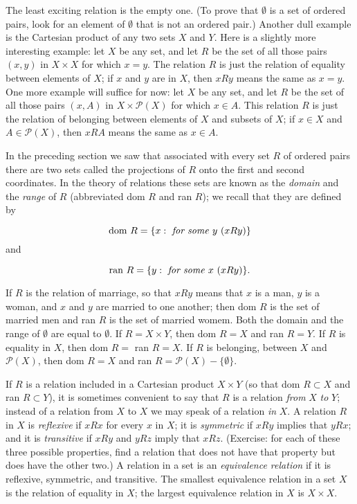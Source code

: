 The least exciting relation is the empty one. (To prove that $ \emptyset $ is a set of ordered pairs, look for an element of $ \emptyset $ that is not an ordered pair.) Another dull example is the Cartesian product of any two sets $X$ and $Y$. Here is a slightly more interesting example: let $X$ be any set, and let $R$ be the set of all those pairs $(x, y)$ in $X \times X$ for which $x = y$. The relation $R $ is just the relation of equality between elements of $X$; if $x$ and $y$ are in $X$, then $x R y$ means the same as $x = y$. One more example will suffice for now: let $X$ be any set, and let $R $ be the set of all those pairs $(x, A)$ in $X \times \mathcal{P} (X)$ for which $x \in A$. This relation $R $ is just the relation of belonging between elements of $X$ and subsets of $X$; if $x \in X$ and $A \in \mathcal{P}(X)$, then $x R A$ means the same as $x \in A$. 

In the preceding section we saw that associated with every set $R$ of ordered pairs there are two sets called the projections of $R$ onto the first and second coordinates. In the theory of relations these sets are known as the \textit{domain} and the \textit{range} of $R$  (abbreviated dom $R$ and ran $R$); we recall that they are defined by 

\begin{equation*}
\text{dom } R = \{ x: \text{ \textit{for some} } y\ (x R y) \}
\end{equation*}
and

\begin{equation*}
\text{ran } R = \{ y: \text{ \textit{for some} } x\ (x R y) \}.
\end{equation*}

If $R$ is the relation of marriage, so that $x R y$ means that $x$ is a man, $y$ is a woman, and $x$ and $y$ are married to one another; then dom $R$ is the set of married men and ran $R$ is the set of married womem. Both the domain and the range of $\emptyset$ are equal to $\emptyset$. If $R = X \times Y$, then dom $ R = X$ and ran $R = Y$. If $R$ is equality in $X$, then dom $R =$ ran $R = X$. If $R$ is belonging, between $X$ and $\mathcal{P}(X)$, then dom $R = X$ and ran $R = \mathcal{P}(X) - \{ \emptyset \}$. 

If $R$ is a relation included in a Cartesian product $X \times Y$ (so that dom $R \subset X$ and ran $R \subset Y$), it is sometimes convenient to say that $R$ is a relation \textit{from} $X$ \textit{to} $Y$; instead of a relation from $X$ to $X$ we may speak of a relation \textit{in} $X$. A relation $R$ in $X$ is \textit{reflexive} if $x R x$ for every $x$ in $X$; it is \textit{symmetric} if $ x R y$ implies that $y R x$; and it is \textit{transitive} if $x R y$ and $y R z$ imply that $x R z$. (Exercise: for each of these three possible properties, find a relation that does not have that property but does have the other two.) A relation in a set is an \textit{equivalence relation} if it is reflexive, symmetric, and transitive. The smallest equivalence relation in a set $X$ is the relation of equality in $X$; the largest equivalence relation in $X$ is $X \times X$. 

